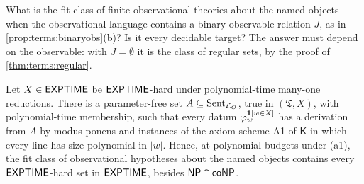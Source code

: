 \begin{question}\label{q:terms:binaryobs}
What is the fit class of finite observational theories about the named objects when the observational language contains a binary observable relation $J$, as in \cref{prop:terms:binaryobs}(b)? Is it every decidable target? The answer must depend on the observable: with $J=\emptyset$ it is the class of regular sets, by the proof of \cref{thm:terms:regular}.
\end{question}

\begin{proposition}\label{prop:terms:a1hard}
Let $X\in\mathsf{EXPTIME}$ be $\mathsf{EXPTIME}$-hard under polynomial-time many-one reductions. There is a parameter-free set $A\subseteq\mathrm{Sent}_{\mathcal{L}_{O}}$, true in $(\mathfrak T,X)$, with polynomial-time membership, such that every datum $\varphi_w^{\mathbf{1}[w\in X]}$ has a derivation from $A$ by modus ponens and instances of the axiom scheme A1 of $\mathsf K$ in which every line has size polynomial in $\lvert w\rvert$. Hence, at polynomial budgets under (a1), the fit class of observational hypotheses about the named objects contains every $\mathsf{EXPTIME}$-hard set in $\mathsf{EXPTIME}$, besides $\mathsf{NP}\cap\mathsf{coNP}$.
\end{proposition}

